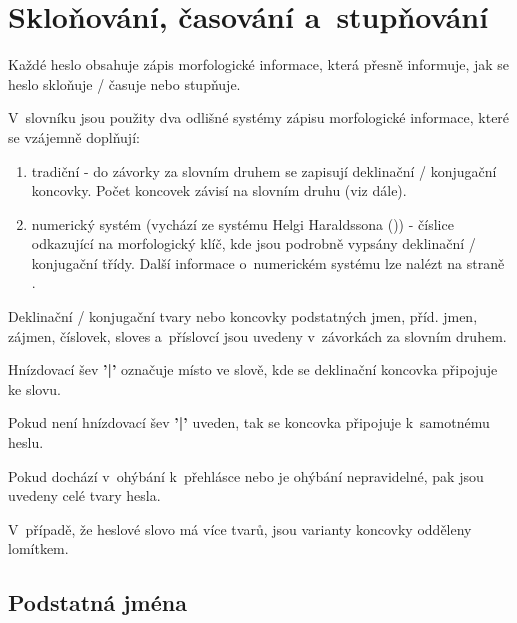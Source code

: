 \section{Skloňování, časování a~stupňování}

Každé heslo obsahuje zápis morfologické informace, která přesně informuje, jak se heslo skloňuje / časuje nebo stupňuje.

V~slovníku jsou použity dva odlišné systémy zápisu morfologické informace, které se vzájemně doplňují:

\begin{enumerate}
\item tradiční - do závorky za slovním druhem se zapisují deklinační / konjugační koncovky. Počet koncovek závisí na slovním druhu (viz dále).
\item numerický systém (vychází ze systému Helgi Haraldssona (\cite {is6})) - číslice odkazující na morfologický klíč, kde jsou podrobně vypsány deklinační / konjugační třídy.
Další informace o~numerickém systému lze nalézt na straně \pageref{sec:dec}.
\end{enumerate}

Deklinační / konjugační tvary nebo koncovky podstatných jmen, příd. jmen, zájmen, číslovek, sloves a~příslovcí jsou uvedeny v~závorkách za slovním druhem.

Hnízdovací šev \textbf{'|'} označuje místo ve slově, kde se deklinační koncovka připojuje ke slovu.

\blspace
  \dicEntry {}  
\blspace

Pokud není hnízdovací šev \textbf{'|'} uveden, tak se koncovka připojuje k~samotnému heslu.

\blspace
  \dicEntry {}  
\blspace

Pokud dochází v~ohýbání k~přehlásce nebo je ohýbání nepravidelné, pak jsou uvedeny celé tvary hesla.

\blspace
  \dicEntry {}  
\blspace

V~případě, že heslové slovo má více tvarů, jsou varianty koncovky odděleny lomítkem.

\blspace
  \dicEntry {}  
\blspace

\subsection*{Podstatná jména}

